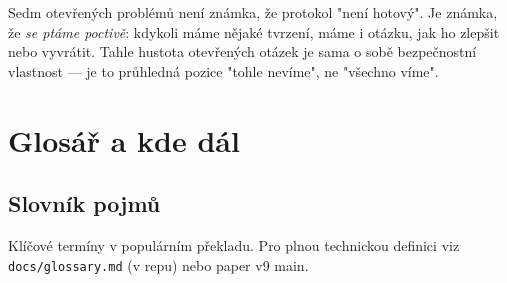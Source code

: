\documentclass[11pt,a4paper]{article}
\begin{document}
\begin{aha}
Sedm otevřených problémů není známka, že protokol "není hotový". Je známka, že \emph{se ptáme poctivě}: kdykoli máme nějaké tvrzení, máme i otázku, jak ho zlepšit nebo vyvrátit. Tahle hustota otevřených otázek je sama o sobě bezpečnostní vlastnost --- je to průhledná pozice "tohle nevíme", ne "všechno víme".
\end{aha}

\section{Glosář a kde dál}\label{pop:glossary}

\subsection{Slovník pojmů}

Klíčové termíny v populárním překladu. Pro plnou technickou definici viz \texttt{docs/glossary.md} (v repu) nebo paper v9 main.
\end{document}
